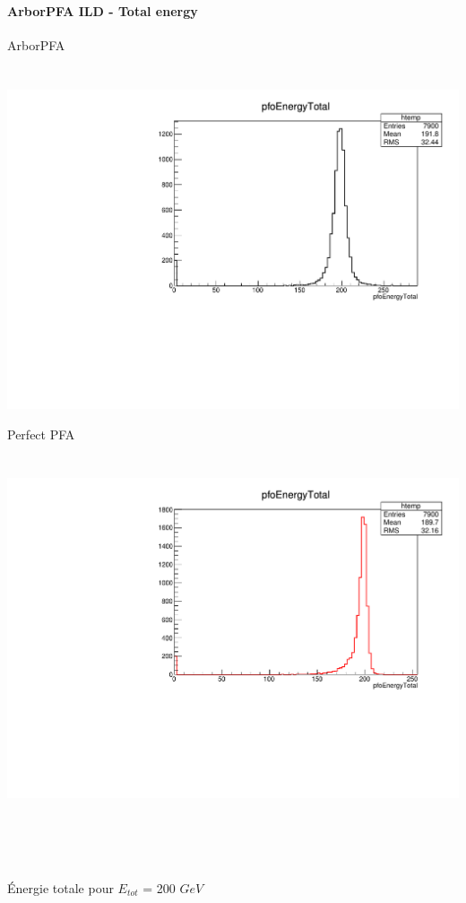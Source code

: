 \documentclass[8pt]{beamer}
\begin{document}
  \begin{frame}
  \frametitle{\backup}
  \framesubtitle{ArborPFA ILD - Total energy}
    \begin{minipage}{0.48\linewidth}
      \begin{center}
        ArborPFA \\
        ~ \\
        ~~~~~\includegraphics[width=\linewidth]{pfoEnergyTotal_ArborPFA.pdf}
      \end{center}
    \end{minipage}
    \begin{minipage}{0.48\linewidth}
      \begin{center}
        Perfect PFA \\
        ~ \\
        ~~~~~\includegraphics[width=\linewidth]{pfoEnergyTotal_PerfectPFA.pdf}
      \end{center}
    \end{minipage}
    ~ \\
    ~ \\
    ~ \\
    \begin{center} Énergie totale pour $E_{tot}$ = 200 $GeV$ \end{center}
  \end{frame}
\end{document}
